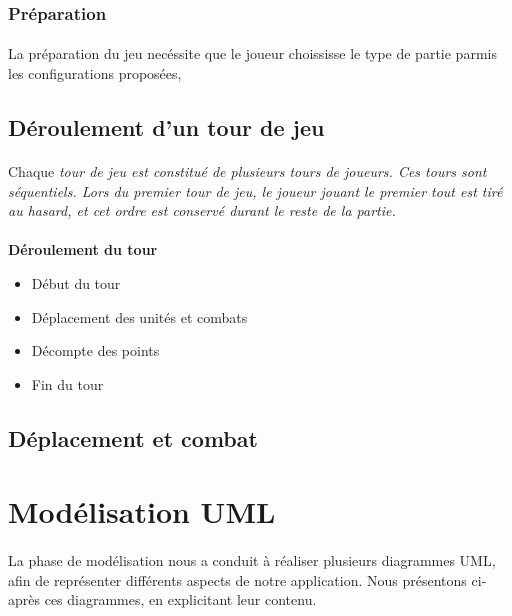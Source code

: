 \documentclass[a4paper]{article}
\begin{document}
\subsubsection{Préparation}
\paragraph{}
La préparation du jeu necéssite que le joueur choississe le type de partie parmis les configurations proposées, 

\subsection{Déroulement d'un tour de jeu}
\paragraph{}
Chaque \em{tour de jeu} est constitué de plusieurs \em{tours de joueurs}. Ces tours sont séquentiels. Lors du premier tour de jeu, le joueur jouant le premier tout est tiré au hasard, et cet ordre est conservé durant le reste de la partie.
\paragraph{}
\textbf{Déroulement du tour}
\begin{itemize}
    \item Début du tour
    \item Déplacement des unités et combats
    \item Décompte des points
    \item Fin du tour
\end{itemize}

\subsection{Déplacement et combat}


\section{Modélisation UML}
\paragraph{}
La phase de modélisation nous a conduit à réaliser plusieurs diagrammes UML, afin de représenter différents aspects de notre application. Nous présentons ci-après ces diagrammes, en explicitant leur contenu.
\end{document}
